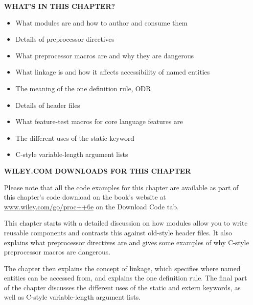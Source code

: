 \noindent
\textbf{WHAT’S IN THIS CHAPTER?}

\begin{itemize}
\item
What modules are and how to author and consume them

\item
Details of preprocessor directives

\item
What preprocessor macros are and why they are dangerous

\item
What linkage is and how it affects accessibility of named entities

\item
The meaning of the one definition rule, ODR

\item
Details of header files

\item
What feature-test macros for core language features are

\item
The different uses of the static keyword

\item
C-style variable-length argument lists
\end{itemize}

\noindent
\textbf{WILEY.COM DOWNLOADS FOR THIS CHAPTER}

Please note that all the code examples for this chapter are available as part of this chapter’s code download on the book’s website at \url{www.wiley.com/go/proc++6e} on the Download Code tab.

This chapter starts with a detailed discussion on how modules allow you to write reusable components and contrasts this against old-style header files. It also explains what preprocessor directives are and gives some examples of why C-style preprocessor macros are dangerous.

The chapter then explains the concept of linkage, which specifies where named entities can be accessed from, and explains the one definition rule. The final part of the chapter discusses the different uses of the static and extern keywords, as well as C-style variable-length argument lists.






























